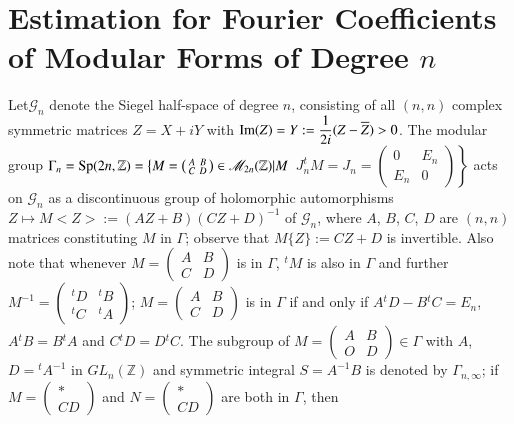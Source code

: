 \section[Estimation for Fourier Coefficients of...]{Estimation for Fourier Coefficients of Modular Forms of
  Degree $n$}\label{c1:sec-1.4}

Let\pageoriginale $\mathscr{G}_{n}$ denote the Siegel half-space of degree $n$,
consisting of all $(n,n)$ complex symmetric matrices $Z=X+iY$ with
$\operatorname{Im} (Z)=Y:=\dfrac{1}{2i}(Z-\overline{Z})>0$. The modular group
$\Gamma_{n}=\operatorname{Sp}(2n,\mathbb{Z})=\left\{M=\left(\begin{smallmatrix} A &
  B\\ C & D\end{smallmatrix}\right)\in
  \mathscr{M}_{2n}(\mathbb{Z})|M \right.$\break
  $\left. J^{t}_{n}M=J_{n}=\left(\begin{smallmatrix} 
    0 & E_{n}\\ E_{n} & 0  \end{smallmatrix}\right)\right\}$ acts on
  $\mathscr{G}_{n}$ as a discontinuous group of holomorphic
  automorphisms $Z\mapsto M<Z>:=(AZ+B)(CZ+D)^{-1}$ of
  $\mathscr{G}_{n}$, where $A$, $B$, $C$, $D$ are $(n,n)$ matrices
  constituting $M$ in $\Gamma$; observe that $M\{Z\}:=CZ+D$ is
  invertible. Also note that whenever $M=\left(\begin{smallmatrix} A &
    B\\ C & D  \end{smallmatrix}\right)$ is in $\Gamma$, ${}^{t}M$ is
  also in $\Gamma$ and further $M^{-1}=\left(\begin{smallmatrix} {}^{t}{D}
    & {}^{t}{B}\\ {}^{t}{C} & {}^{t}{A}  \end{smallmatrix}\right)$;
  $M=\left(\begin{smallmatrix} A & B\\ C & D
  \end{smallmatrix}\right)$ is in $\Gamma$ if and only if
  $A{}^{t}D-B{}^{t}C=E_{n}$, $A{}^{t}B=B{}^{t}A$ and $C{}^{t}D=
  D{}^{t}C$. The subgroup of $M=\left(\begin{smallmatrix} A & B\\ O &
    D
  \end{smallmatrix}\right)\in\Gamma$ with $A$, $D={}^{t}A^{-1}$ in
  $GL_{n}(\mathbb{Z})$ and symmetric integral $S=A^{-1}B$ is denoted
  by $\Gamma_{n,\infty}$; if $M=\left(\begin{smallmatrix} \ast\\ CD
  \end{smallmatrix}\right)$ and $N=\left(\begin{smallmatrix}\ast\\ CD
  \end{smallmatrix}\right)$ are both in $\Gamma$, then
